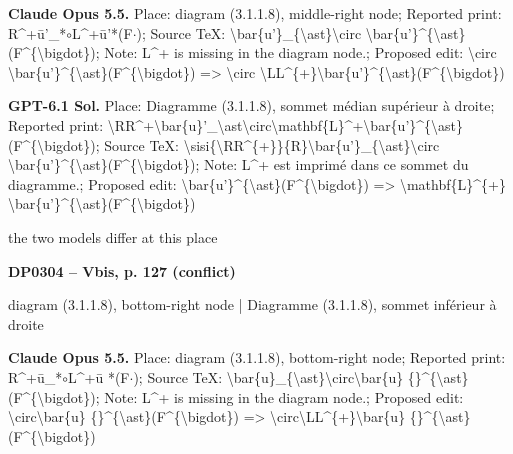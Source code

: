 \textbf{Claude Opus 5.5.} Place: diagram (3.1.1.8), middle-right node; Reported print: R\textasciicircum{}+ū'\_*\ensuremath{\circ}L\textasciicircum{}+ū'*(F\ensuremath{\cdot}); Source TeX: \textbackslash{}bar\{u'\}\_\{\textbackslash{}ast\}\textbackslash{}circ \textbackslash{}bar\{u'\}\textasciicircum{}\{\textbackslash{}ast\}(F\textasciicircum{}\{\textbackslash{}bigdot\}); Note: L\textasciicircum{}+ is missing in the diagram node.; Proposed edit: \textbackslash{}circ      \textbackslash{}bar\{u'\}\textasciicircum{}\{\textbackslash{}ast\}(F\textasciicircum{}\{\textbackslash{}bigdot\}) =\allowbreak > \textbackslash{}circ      \textbackslash{}LL\textasciicircum{}\{+\}\textbackslash{}bar\{u'\}\textasciicircum{}\{\textbackslash{}ast\}(F\textasciicircum{}\{\textbackslash{}bigdot\})\par
\textbf{GPT-6.1 Sol.} Place: Diagramme (3.1.1.8), sommet médian supérieur à droite; Reported print: \textbackslash{}RR\textasciicircum{}+\textbackslash{}bar\{u\}'\_\textbackslash{}ast\textbackslash{}circ\textbackslash{}mathbf\{L\}\textasciicircum{}+\textbackslash{}bar\{u'\}\textasciicircum{}\{\textbackslash{}ast\}(F\textasciicircum{}\{\textbackslash{}bigdot\}); Source TeX: \textbackslash{}sisi\{\textbackslash{}RR\textasciicircum{}\{+\}\}\{R\}\textbackslash{}bar\{u'\}\_\{\textbackslash{}ast\}\textbackslash{}circ      \textbackslash{}bar\{u'\}\textasciicircum{}\{\textbackslash{}ast\}(F\textasciicircum{}\{\textbackslash{}bigdot\}); Note: L\textasciicircum{}+ est imprimé dans ce sommet du diagramme.; Proposed edit: \textbackslash{}bar\{u'\}\textasciicircum{}\{\textbackslash{}ast\}(F\textasciicircum{}\{\textbackslash{}bigdot\}) =\allowbreak > \textbackslash{}mathbf\{L\}\textasciicircum{}\{+\} \textbackslash{}bar\{u'\}\textasciicircum{}\{\textbackslash{}ast\}(F\textasciicircum{}\{\textbackslash{}bigdot\})\par
the two models differ at this place\par
\par\noindent\hypertarget{DP0304}{}\textbf{DP0304 -- Vbis, p. 127 (conflict)}\par
diagram (3.1.1.8), bottom-right node | Diagramme (3.1.1.8), sommet inférieur à droite\par
\textbf{Claude Opus 5.5.} Place: diagram (3.1.1.8), bottom-right node; Reported print: R\textasciicircum{}+ū\_*\ensuremath{\circ}L\textasciicircum{}+ū *(F\ensuremath{\cdot}); Source TeX: \textbackslash{}bar\{u\}\_\{\textbackslash{}ast\}\textbackslash{}circ\textbackslash{}bar\{u\} \{\}\textasciicircum{}\{\textbackslash{}ast\}(F\textasciicircum{}\{\textbackslash{}bigdot\}); Note: L\textasciicircum{}+ is missing in the diagram node.; Proposed edit: \textbackslash{}circ\textbackslash{}bar\{u\} \{\}\textasciicircum{}\{\textbackslash{}ast\}(F\textasciicircum{}\{\textbackslash{}bigdot\}) =\allowbreak > \textbackslash{}circ\textbackslash{}LL\textasciicircum{}\{+\}\textbackslash{}bar\{u\} \{\}\textasciicircum{}\{\textbackslash{}ast\}(F\textasciicircum{}\{\textbackslash{}bigdot\})\par

